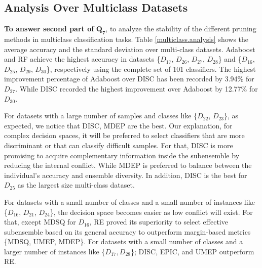 \subsection{Analysis Over Multiclass Datasets} \label{overmulti}
\textbf{To answer second part of} $\pmb{Q_7}$, to analyze the stability of the different pruning methods in multiclass classification tasks. Table \ref{multiclass.analysis} shows the average accuracy and the standard deviation over multi-class datasets. Adaboost and RF achieve the highest accuracy in datasets \{$D_{17}$, $D_{26}$, $D_{27}$, $D_{28}$\} and \{$D_{16}$, $D_{25}$, $D_{29}$, $D_{30}$\}, respectively using the complete set of 101 classifiers. The highest improvement percentage of Adaboost over DISC has been recorded by 3.94\% for $D_{27}$. While DISC recorded the highest improvement over Adaboost by 12.77\% for $D_{30}$.

For datasets with a large number of samples and classes like  \{$D_{22}$, $D_{23}$\}, as expected, we notice that DISC, MDEP are the best. Our explanation, for complex decision spaces, it will be preferred to select classifiers that are more discriminant or that can classify difficult samples. For that, DISC is more promising to acquire complementary information inside the subensemble by reducing the internal conflict. While MDEP is preferred to balance between the individual's accuracy and ensemble diversity. In addition, DISC is the best for $D_{25}$ as the largest size multi-class dataset.   

For datasets with a small number of classes and a small number of instances like \{$D_{16}$, $D_{21}$, $D_{24}$\}, the decision space becomes easier as low conflict will exist. For that, except MDSQ for $D_{16}$, RE proved its superiority to select effective subensemble based on its general accuracy to outperform margin-based metrics \{MDSQ, UMEP, MDEP\}.  For datasets with a small number of classes and a larger number of instances like \{$D_{17}, D_{28}$\}; DISC, EPIC, and UMEP outperform RE.      



